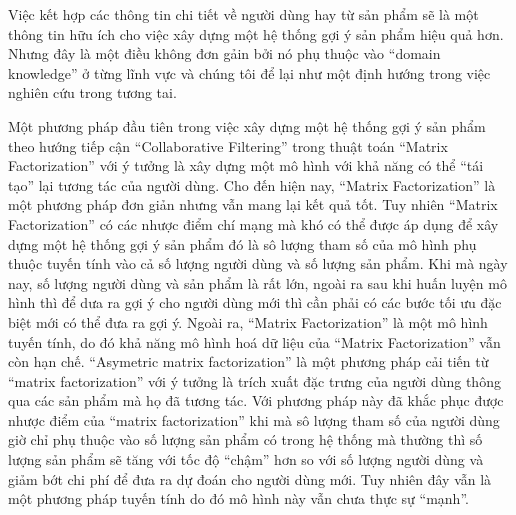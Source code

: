 Việc kết hợp các thông tin chi tiết về người dùng hay từ sản phẩm sẽ là một thông tin hữu ích cho việc xây dựng một hệ thống gợi ý sản phẩm hiệu quả hơn. Nhưng đây là một điều không đơn gảin bởi nó phụ thuộc vào ``domain knowledge'' ở từng lĩnh vực và chúng tôi để lại như một định hướng trong việc nghiên cứu trong tương tai.

Một phương pháp đầu tiên trong việc xây dựng một hệ thống gợi ý sản phẩm theo hướng tiếp cận ``Collaborative Filtering'' trong thuật toán ``Matrix Factorization'' với ý tưởng là xây dựng một mô hình với khả năng có thể ``tái tạo'' lại tương tác của người dùng.
Cho đến hiện nay, ``Matrix Factorization'' là một phương pháp đơn giản nhưng vẫn mang lại kết quả tốt.
Tuy nhiên ``Matrix Factorization'' có các nhược điểm chí mạng mà khó có thể được áp dụng để xây dựng một hệ thống gợi ý sản phẩm đó là sô lượng tham số của mô hình phụ thuộc tuyến tính vào cả số lượng người dùng và số lượng sản phẩm.
Khi mà ngày nay, số lượng người dùng và sản phẩm là rất lớn, ngoài ra sau khi huấn luyện mô hình thì để dưa ra gợi ý cho người dùng mới thì cần phải có các bước tối ưu đặc biệt mới có thể đưa ra gợi ý. 
Ngoài ra, ``Matrix Factorization'' là một mô hình tuyến tính, do đó khả năng mô hình hoá dữ liệu của ``Matrix Factorization'' vẫn còn hạn chế.
``Asymetric matrix factorization'' là một phương pháp cải tiến từ ``matrix factorization'' với ý tưởng là trích xuất đặc trưng của người dùng thông qua các sản phẩm mà họ đã tương tác. Với phương pháp này đã khắc phục được nhược điểm của ``matrix factorization'' khi mà sô lượng tham số của người dùng giờ chỉ phụ thuộc vào số lượng sản phẩm có trong hệ thống mà thường thì số lượng sản phẩm sẽ tăng với tốc độ ``chậm'' hơn so với số lượng người dùng và giảm bớt chi phí để đưa ra dự đoán cho người dùng mới. Tuy nhiên đây vẫn là một phương pháp tuyến tính do đó mô hình này vẫn chưa thực sự ``mạnh''. 

